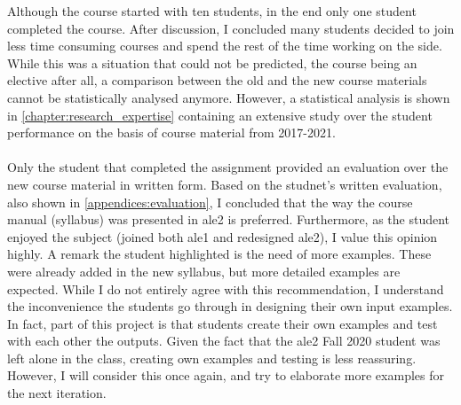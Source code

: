 Although the course started with ten students, in the end only one student completed the course. After discussion, I concluded many students decided to join less time consuming courses and spend the rest of the time working on the side. While this was a situation that could not be predicted, the course being an elective after all, a comparison between the old and the new course materials cannot be statistically analysed anymore. However, a statistical analysis is shown in  \cref{chapter:research_expertise} containing an extensive study over the student performance on the basis of course material from 2017-2021.\\\\
Only the student that completed the assignment provided an evaluation over the new course material in written form. Based on the studnet's written evaluation, also shown in \cref{appendices:evaluation}, I concluded that the way the course manual (syllabus) was presented in \acrshort{ale}2 is preferred. Furthermore, as the student enjoyed the subject (joined both \acrshort{ale}1 and redesigned \acrshort{ale}2), I value this opinion highly. A remark the student highlighted is the need of more examples. These were already added in the new syllabus, but more detailed examples are expected. While I do not entirely agree with this recommendation, I understand the inconvenience the students go through in designing their own input examples. In fact, part of this project is that students create their own examples and test with each other the outputs. Given the fact that the \acrshort{ale}2 Fall 2020 student was left alone in the class, creating own examples and testing is less reassuring. However, I will consider this once again, and try to elaborate more examples for the next iteration.

